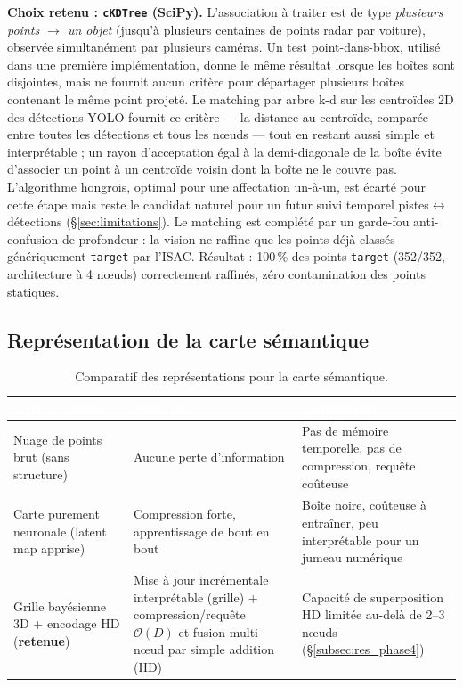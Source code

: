 \documentclass[12pt,a4paper,titlepage]{article}
\newcommand{\hd}[1]{\textcolor{white}{\textbf{#1}}}
\newcommand{\choix}{\rowcolor{tabchoice}}
\begin{document}
\textbf{Choix retenu : \texttt{cKDTree} (SciPy).} L'association à traiter est de type \textit{plusieurs points $\to$ un objet} (jusqu'à plusieurs centaines de points radar par voiture), observée simultanément par plusieurs caméras. Un test point-dans-bbox, utilisé dans une première implémentation, donne le même résultat lorsque les boîtes sont disjointes, mais ne fournit aucun critère pour départager plusieurs boîtes contenant le même point projeté. Le matching par arbre k-d sur les centroïdes 2D des détections YOLO fournit ce critère --- la distance au centroïde, comparée entre toutes les détections et tous les n\oe uds --- tout en restant aussi simple et interprétable ; un rayon d'acceptation égal à la demi-diagonale de la boîte évite d'associer un point à un centroïde voisin dont la boîte ne le couvre pas. L'algorithme hongrois, optimal pour une affectation un-à-un, est écarté pour cette étape mais reste le candidat naturel pour un futur suivi temporel pistes$\leftrightarrow$détections (\S\ref{sec:limitations}). Le matching est complété par un garde-fou anti-confusion de profondeur : la vision ne raffine que les points déjà classés génériquement \texttt{target} par l'ISAC. Résultat : 100\,\% des points \texttt{target} (352/352, architecture à 4 n\oe uds) correctement raffinés, zéro contamination des points statiques.

\subsection{Représentation de la carte sémantique}
\label{subsec:choix_representation}

\begin{table}[H]
    \centering
    \caption{Comparatif des représentations pour la carte sémantique.}
    \begin{tabularx}{\textwidth}{F{3.8cm}LL}
        \toprule
        \hd{Représentation} & \hd{Avantage} & \hd{Inconvénient} \\
        \midrule
        Nuage de points brut (sans structure) & Aucune perte d'information & Pas de mémoire temporelle, pas de compression, requête coûteuse \\
        Carte purement neuronale (latent map apprise) & Compression forte, apprentissage de bout en bout & Boîte noire, coûteuse à entraîner, peu interprétable pour un jumeau numérique \\
        \choix Grille bayésienne 3D + encodage HD (\textbf{retenue}) & Mise à jour incrémentale interprétable (grille) + compression/requête $\mathcal{O}(D)$ et fusion multi-n\oe ud par simple addition (HD) & Capacité de superposition HD limitée au-delà de 2--3 n\oe uds (\S\ref{subsec:res_phase4}) \\
        \bottomrule
    \end{tabularx}
\end{table}
\end{document}
